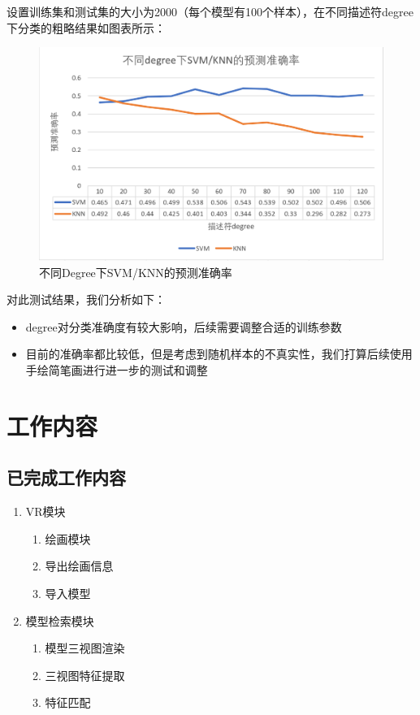 \documentclass{article}
\begin{document}
\begin{enumerate}
    \qquad 设置训练集和测试集的大小为2000（每个模型有100个样本），在不同描述符degree下分类的粗略结果如图表所示：
    
    \begin{figure}[htb]
    \centering
    \includegraphics[width=1\textwidth]{images/predict.png}
    \caption{不同Degree下SVM/KNN的预测准确率}\label{fig:digit}
    \end{figure} 
    
    对此测试结果，我们分析如下：
    
\begin{itemize}
    \item  degree对分类准确度有较大影响，后续需要调整合适的训练参数
    \item 目前的准确率都比较低，但是考虑到随机样本的不真实性，我们打算后续使用手绘简笔画进行进一步的测试和调整
\end{itemize}

\end{enumerate}

\clearpage
\newpage

\section{工作内容}

\subsection{已完成工作内容}
\begin{enumerate}
    \item VR模块
    
    \begin{enumerate}
    \item 绘画模块
    \item 导出绘画信息
    \item 导入模型
    \end{enumerate}
    
    \item 模型检索模块
    
    \begin{enumerate}
    \item 模型三视图渲染
    \item 三视图特征提取
    \item 特征匹配
    \end{enumerate}

\end{enumerate}
\end{document}
